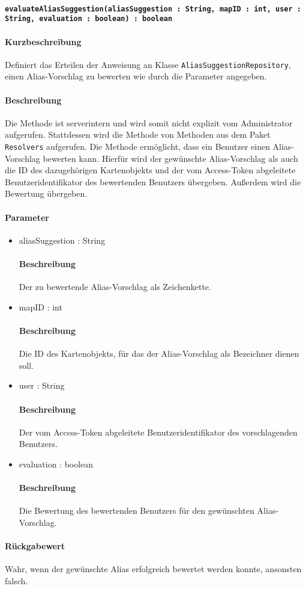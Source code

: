 \paragraph*{\texttt{evaluateAliasSuggestion(aliasSuggestion : String, mapID : int, user : String, evaluation : boolean) : boolean}}%
\paragraph*{Kurzbeschreibung}
Definiert das Erteilen der Anweisung an Klasse \texttt{AliasSuggestionRepository}, einen Alias-Vorschlag zu bewerten wie durch die Parameter angegeben.
\paragraph*{Beschreibung}
Die Methode ist serverintern und wird somit nicht explizit vom Administrator aufgerufen.
Stattdessen wird die Methode von Methoden aus dem Paket \texttt{Resolvers} aufgerufen.
Die Methode ermöglicht, dass ein Benutzer einen Alias-Vorschlag bewerten kann. 
Hierfür wird der gewünschte Alias-Vorschlag als auch die ID des dazugehörigen Kartenobjekts und der vom Access-Token abgeleitete Benutzeridentifikator des bewertenden Benutzers übergeben.
Außerdem wird die Bewertung übergeben.
\paragraph*{Parameter}
\begin{itemize}
	\item aliasSuggestion : String
		\paragraph*{Beschreibung}
		Der zu bewertende Alias-Vorschlag als Zeichenkette.
	\item mapID : int
		\paragraph*{Beschreibung}
		Die ID des Kartenobjekts, für das der Alias-Vorschlag als Bezeichner dienen soll.
	\item user : String
		\paragraph*{Beschreibung}
		Der vom Access-Token abgeleitete Benutzeridentifikator des vorschlagenden Benutzers.
	\item evaluation : boolean
		\paragraph*{Beschreibung}
		Die Bewertung des bewertenden Benutzers für den gewünschten Alias-Vorschlag.
\end{itemize}
\paragraph*{Rückgabewert}
Wahr, wenn der gewünschte Alias erfolgreich bewertet werden konnte, ansonsten falsch.

